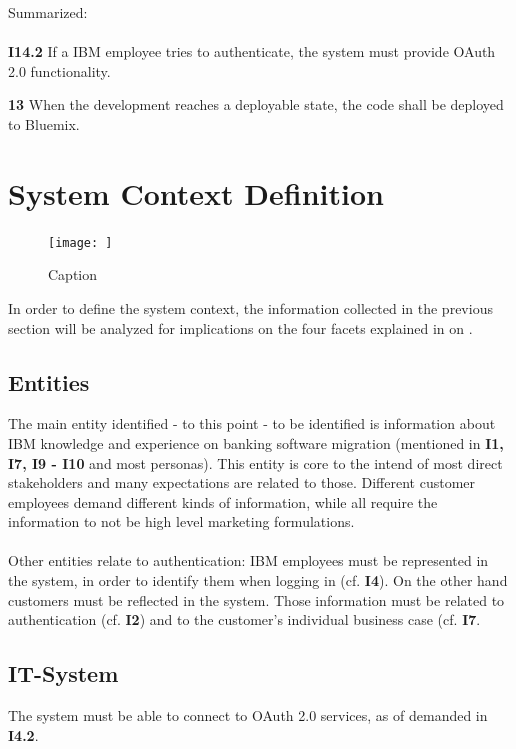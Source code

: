 Summarized: 

\paragraph{}
\begin{closeItem}
\item [\textbf{I14.2}] If a IBM employee tries to authenticate, the system must provide OAuth 2.0 functionality. 
\item[\textbf{13}] When the development reaches a deployable state, the code shall be deployed to Bluemix.
\end{closeItem}
\section{System Context Definition}

\begin{figure}
    \centering
    \texttt{[image: ]}
    \caption{Caption}
    \label{fig:my_label}
\end{figure}

In order to define the system context, the information collected in the previous section will be analyzed for implications on the four facets explained in \Cref{} on \cpagerefrange{}{}.

\subsection{Entities}
The main entity identified - to this point - to be identified is information about IBM knowledge and experience on banking software migration (mentioned in \textbf{I1, I7, I9 - I10} and most personas). This entity is core to the intend of most direct stakeholders and many expectations are related to those. Different customer employees demand different kinds of information, while all require the information to not be high level marketing formulations.

\paragraph{} Other entities relate to authentication: IBM employees must be represented in the system, in order to identify them when logging in (cf. \textbf{I4}). On the other hand customers must be reflected in the system. Those information must be related to authentication (cf. \textbf{I2}) and to the customer's individual business case (cf. \textbf{I7}. 
\subsection{IT-System}
The system must be able to connect to OAuth 2.0 services, as of demanded in \textbf{I4.2}.

